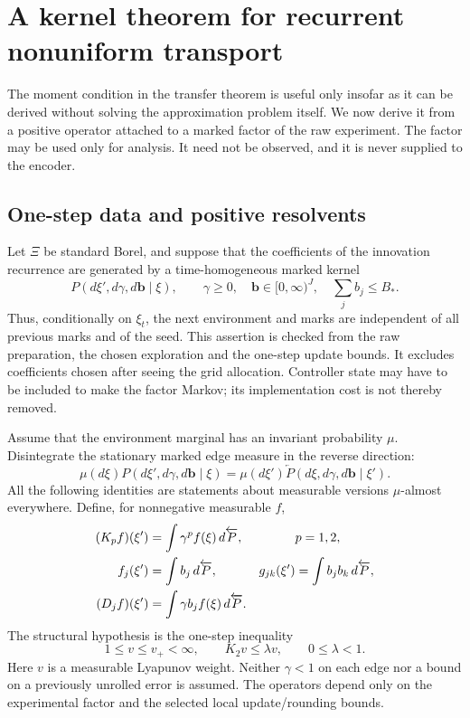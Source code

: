 \section{A kernel theorem for recurrent nonuniform transport}\label{sec:kernel}
The moment condition in the transfer theorem is useful only insofar as it can be derived without solving the approximation problem itself. We now derive it from a positive operator attached to a marked factor of the raw experiment. The factor may be used only for analysis. It need not be observed, and it is never supplied to the encoder.

\subsection{One-step data and positive resolvents}
Let $\Xi$ be standard Borel, and suppose that the coefficients of the innovation recurrence are generated by a time-homogeneous marked kernel
\begin{equation}\label{eq:marked-kernel}
 P(d\xi',d\gamma,d\mathbf b\mid\xi),\qquad
 \gamma\ge0,\quad \mathbf b\in[0,\infty)^J,\quad \sum_j b_j\le B_*.
\end{equation}
Thus, conditionally on $\xi_t$, the next environment and marks are independent of all previous marks and of the seed. This assertion is checked from the raw preparation, the chosen exploration and the one-step update bounds. It excludes coefficients chosen after seeing the grid allocation. Controller state may have to be included to make the factor Markov; its implementation cost is not thereby removed.

Assume that the environment marginal has an invariant probability $\mu$. Disintegrate the stationary marked edge measure in the reverse direction:
\[
 \mu(d\xi)P(d\xi',d\gamma,d\mathbf b\mid\xi)
   =\mu(d\xi')\overleftarrow P(d\xi,d\gamma,d\mathbf b\mid\xi').
\]
All the following identities are statements about measurable versions $\mu$-almost everywhere. Define, for nonnegative measurable $f$,
\begin{align}
 (K_p f)(\xi')&=\int\gamma^p f(\xi)\,d\overleftarrow P,
       &&p=1,2,\label{eq:positive-operators}\\
 f_j(\xi')&=\int b_j\,d\overleftarrow P,
 &g_{jk}(\xi')&=\int b_jb_k\,d\overleftarrow P,\notag\\
 (D_jf)(\xi')&=\int\gamma b_j f(\xi)\,d\overleftarrow P.\notag
\end{align}
The structural hypothesis is the one-step inequality
\begin{equation}\label{eq:kernel-drift}
 1\le v\le v_+<\infty,\qquad K_2v\le\lambda v,
 \qquad 0\le\lambda<1.
\end{equation}
Here $v$ is a measurable Lyapunov weight. Neither $\gamma<1$ on each edge nor a bound on a previously unrolled error is assumed. The operators depend only on the experimental factor and the selected local update/rounding bounds.

